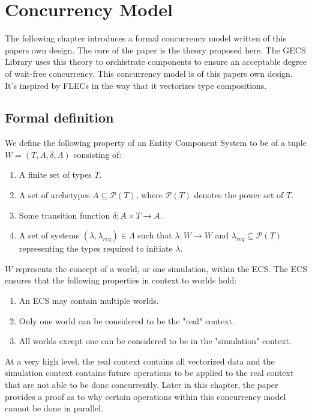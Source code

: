 
\section{Concurrency Model}
\label{chap:2}
The following chapter introduces a formal concurrency model written of this papers own design. The core of the paper is the theory proposed here. The GECS Library uses this theory to orchistrate components to ensure an acceptable degree of wait-free concurrency. This concurrency model is of this papers own design. It's inspired by FLECs in the way that it vectorizes type compositions.

\subsection{Formal definition} \label{section:formal_definition}
We define the following property of an Entity Component System to be of a tuple $W = (T, A, \delta, \Lambda)$ consisting of:
\begin{enumerate}
    \item A finite set of types $T$.
    \item A set of archetypes $A \subseteq \mathcal{P}(T)$, where $\mathcal{P}(T)$ denotes the power set of $T$.
    \item Some transition function $\delta : A \times T \rightarrow A$.
    \item A set of systems $(\lambda, \lambda_{req}) \in \Lambda$ such that $\lambda : W \rightarrow W$ and $\lambda_{req} \subseteq \mathcal{P}(T)$ representing the types required to initiate $\lambda$.
\end{enumerate}
$W$ represents the concept of a world, or one simulation, within the ECS. The ECS ensures that the following properties in context to worlds hold:

\begin{enumerate}
    \item An ECS may contain multiple worlds.
    \item Only one world can be considered to be the "real" context.
    \item All worlds except one can be considered to be in the "simulation" context.
\end{enumerate}

At a very high level, the real context contains all vectorized data and the simulation context contains future operations to be applied to the real context that are not able to be done concurrently. Later in this chapter, the paper provides a proof as to why certain operations within this concurrency model cannot be done in parallel. 

